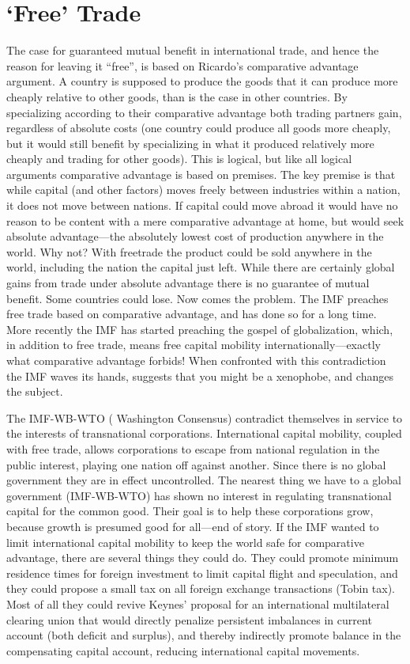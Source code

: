 \documentclass[
]{book}
\begin{document}
\hypertarget{free-trade}{%
\section{`Free' Trade}\label{free-trade}}

The case for guaranteed mutual benefit in international trade, and hence the reason for leaving it ``free'', is based on
Ricardo's comparative advantage argument. A country is supposed to produce the goods that it can produce more
cheaply relative to other goods, than is the case in other countries. By specializing according to their comparative
advantage both trading partners gain, regardless of absolute costs (one country could produce all goods more cheaply,
but it would still benefit by specializing in what it produced relatively more cheaply and trading for other goods). This
is logical, but like all logical arguments comparative advantage is based on premises. The key premise is that while
capital (and other factors) moves freely between industries within a nation, it does not move between nations. If
capital could move abroad it would have no reason to be content with a mere comparative advantage at home, but
would seek absolute advantage---the absolutely lowest cost of production anywhere in the world. Why not? With freetrade the product could be sold anywhere in the world, including the nation the capital just left. While there are
certainly global gains from trade under absolute advantage there is no guarantee of mutual benefit. Some countries
could lose.
Now comes the problem. The IMF preaches free trade based on comparative advantage, and has done so for a long
time. More recently the IMF has started preaching the gospel of globalization, which, in addition to free trade, means
free capital mobility internationally---exactly what comparative advantage forbids! When confronted with this
contradiction the IMF waves its hands, suggests that you might be a xenophobe, and changes the subject.

The IMF-WB-WTO ( Washington Consensus) contradict themselves in service to the interests of transnational
corporations. International capital mobility, coupled with free trade, allows corporations to escape from national
regulation in the public interest, playing one nation off against another. Since there is no global government they
are in effect uncontrolled. The nearest thing we have to a global government (IMF-WB-WTO) has shown no
interest in regulating transnational capital for the common good. Their goal is to help these corporations grow,
because growth is presumed good for all---end of story.
If the IMF wanted to limit international capital mobility to keep the world safe for comparative advantage, there are
several things they could do. They could promote minimum residence times for foreign investment to limit capital
flight and speculation, and they could propose a small tax on all foreign exchange transactions (Tobin tax). Most of all
they could revive Keynes' proposal for an international multilateral clearing union that would directly penalize
persistent imbalances in current account (both deficit and surplus), and thereby indirectly promote balance in the
compensating capital account, reducing international capital movements.
\end{document}
